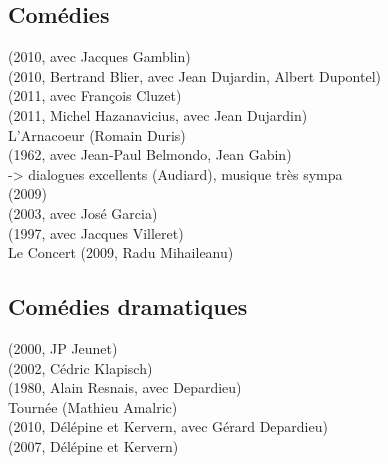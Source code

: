 \subsection{Comédies}
(2010, avec Jacques Gamblin) \\
 (2010, Bertrand Blier, avec Jean Dujardin, Albert Dupontel)\\
(2011, avec François Cluzet)  \\
(2011, Michel Hazanavicius, avec Jean Dujardin) \\
L'Arnacoeur (Romain Duris) \\
 (1962, avec Jean-Paul Belmondo, Jean Gabin)\\  -> dialogues excellents (Audiard), musique très sympa \\
(2009) \\
(2003, avec José Garcia) \\
(1997, avec Jacques Villeret) \\
Le Concert (2009, Radu Mihaileanu) \\


\subsection{Comédies dramatiques}
  (2000, JP Jeunet) \\
 (2002, Cédric Klapisch) \\
 (1980, Alain Resnais, avec Depardieu) \\
Tournée (Mathieu Amalric) \beau \\
 (2010, Délépine et Kervern, avec Gérard Depardieu) \\
 (2007, Délépine et Kervern) \\

